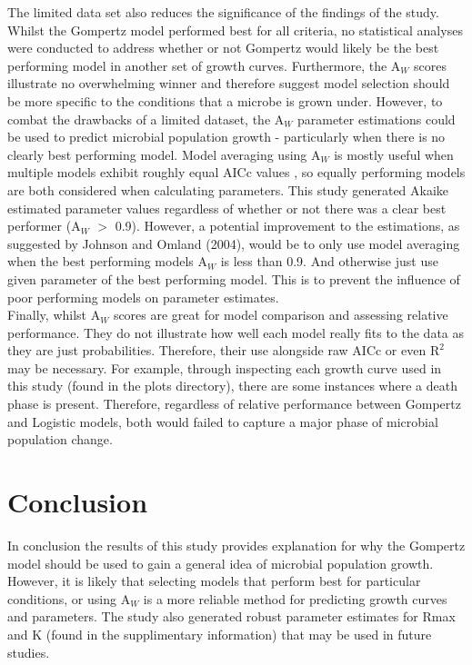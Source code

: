 \documentclass[12pt]{article}
\begin{document}
The limited data set also reduces the significance of the findings of the study. Whilst the Gompertz model performed best for all criteria, no statistical analyses were conducted to address whether or not Gompertz would likely be the best performing model in another set of growth curves. Furthermore, the $\mathrm{A}_{\textit{W}}$ scores illustrate no overwhelming winner and therefore suggest model selection should be more specific to the conditions that a microbe is grown under. However, to combat the drawbacks of a limited dataset, the $\mathrm{A}_{\textit{W}}$ parameter estimations could be used to predict microbial population growth - particularly when there is no clearly best performing model. Model averaging using $\mathrm{A}_{\textit{W}}$ is mostly useful when multiple models exhibit roughly equal AICc values \cite{JOHNSON2004101}, so equally performing models are both considered when calculating parameters. This study generated Akaike estimated parameter values regardless of whether or not there was a clear best performer ($\mathrm{A}_{\textit{W}}$ $>$ 0.9). However, a potential improvement to the estimations, as suggested by Johnson and Omland (2004), would be to only use model averaging when the best performing models $\mathrm{A}_{\textit{W}}$ is less than 0.9. And otherwise just use given parameter of the best performing model. This is to prevent the influence of poor performing models on parameter estimates.\\

Finally, whilst $\mathrm{A}_{\textit{W}}$ scores are great for model comparison and assessing relative performance. They do not illustrate how well each model really fits to the data as they are just probabilities. Therefore, their use alongside raw AICc or even $\mathrm{R}^2$ may be necessary. For example, through inspecting each growth curve used in this study (found in the plots directory), there are some instances where a death phase is present. Therefore, regardless of relative performance between Gompertz and Logistic models, both would failed to capture a major phase of microbial population change.

\section{Conclusion}
In conclusion the results of this study provides explanation for why the Gompertz model should be used to gain a general idea of microbial population growth. However, it is likely that selecting models that perform best for particular conditions, or using $\mathrm{A}_{\textit{W}}$ is a more reliable method for predicting growth curves and parameters. The study also generated robust parameter estimates for Rmax and K (found in the supplimentary information) that may be used in future studies.

  
  
  

  
\end{document}
